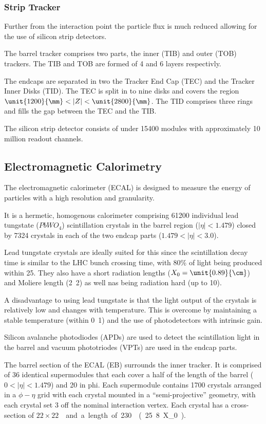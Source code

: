 \subsubsection{Strip Tracker}
Further from the interaction point the particle flux is much reduced allowing
for the use of silicon strip detectors. 

The barrel tracker comprises two parts, the inner (TIB) and outer (TOB)
trackers. The TIB and TOB are formed of 4 and 6 layers respectivly.

The endcaps are separated in two the Tracker End Cap (TEC) and the Tracker Inner
Disks (TID). The TEC is split in to nine disks and covers the region
$\unit{1200}{\mm} < |Z| < \unit{2800}{\mm}$. The TID comprises three rings
and fills the gap between the TEC and the TIB.

The silicon strip detector consists of under 15400 modules with approximately 10
million readout channels.

\subsection{Electromagnetic Calorimetry}
The electromagnetic calorimeter (ECAL) is 
designed to measure the energy of
particles with a high resolution and granularity.

It is a hermetic, homogenous calorimeter comprising 61200 individual lead
tungstate ($PbWO_{4}$) scintillation crystals in the barrel region
($|\eta|<1.479$) closed by 7324 crystals in each of the two endcap parts
($1.479<|\eta|<3.0$).

Lead tungstate crystals are ideally suited for this since the scintillation
decay time is similar to the LHC bunch crossing time, 
with \unit{80}{\%} of light being produced within \unit{25}{\ns}.
They also have a short radiation lengths ($X_0=\unit{0.89}{\cm}$) 
and Moliere length (\unit{2.2}{\cm}) as well nas being radiation hard
(up to \unit{10}{\mrad}).

A disadvantage to using lead tungstate is that the light output of the crystals
is relatively low and changes with temperature. This is overcome by maintaining
a stable temperature (within \unit{0.1}{\degreecelsius}) and the use of
photodetectors with intrinsic gain.

Silicon avalanche photodiodes (APDs) are used to detect the scintillation light
in the barrel and vacuum phototriodes (VPTs) are used in the endcap parts.

The barrel section of the ECAL (EB) surrounds the inner tracker. It is comprised
of 36 identical supermodules that each cover a half of the length of the barrel
($0<|\eta|<1.479$) and \unit{20}{\degree} in phi. Each supermodule contains
1700 crystals arranged in a $\phi - \eta$ grid with each crystal mounted in a
``semi-projective'' geometry, with each crystal set \unit{3}{\degree} off the
nominal interaction vertex. Each crystal has a cross-section of
\unit{$22 \times 22$}{\mm\squared} and a length of
\unit{230}{\mm}(\unit{25.8}{X_0}).

